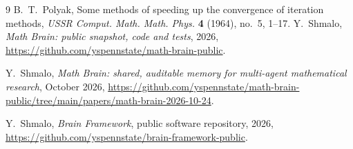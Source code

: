 \documentclass[11pt]{amsart}
\theoremstyle{definition}
\theoremstyle{remark}
\numberwithin{equation}{section}
\begin{document}
\begin{thebibliography}{9}
B.~T.~Polyak, Some methods of speeding up the convergence of iteration methods, \emph{USSR Comput. Math. Math. Phys.} \textbf{4} (1964), no.~5, 1--17.
 Y.~Shmalo, \emph{Math Brain: public snapshot, code and tests}, 2026, \url{https://github.com/yspennstate/math-brain-public}.

 Y.~Shmalo, \emph{Math Brain: shared, auditable memory for multi-agent mathematical research}, October 2026, \url{https://github.com/yspennstate/math-brain-public/tree/main/papers/math-brain-2026-10-24}.

 Y.~Shmalo, \emph{Brain Framework}, public software repository, 2026, \url{https://github.com/yspennstate/brain-framework-public}.

\end{thebibliography}
\end{document}
